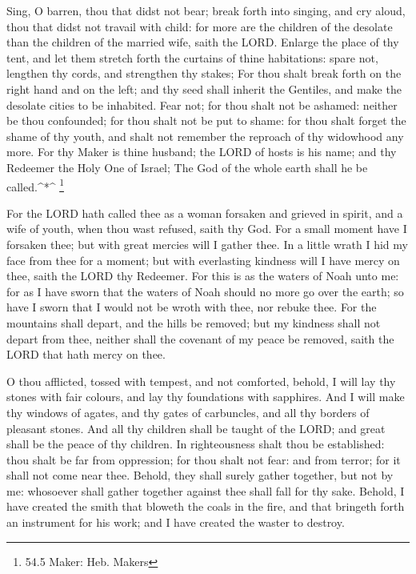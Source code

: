  Sing, O barren, thou that didst not bear; break forth into
singing, and cry aloud, thou that didst not travail with child: for more
are the children of the desolate than the children of the married wife,
saith the LORD.  Enlarge the place of thy tent, and let them
stretch forth the curtains of thine habitations: spare not, lengthen thy
cords, and strengthen thy stakes;  For thou shalt break
forth on the right hand and on the left; and thy seed shall inherit the
Gentiles, and make the desolate cities to be inhabited. 
Fear not; for thou shalt not be ashamed: neither be thou confounded; for
thou shalt not be put to shame: for thou shalt forget the shame of thy
youth, and shalt not remember the reproach of thy widowhood any more.
 For thy Maker is thine husband; the LORD of hosts is his
name; and thy Redeemer the Holy One of Israel; The God of the whole
earth shall he be called.\^{}*\^{} \footnote{54.5 Maker: Heb. Makers}

 For the LORD hath called thee as a woman forsaken and
grieved in spirit, and a wife of youth, when thou wast refused, saith
thy God.  For a small moment have I forsaken thee; but with
great mercies will I gather thee.  In a little wrath I hid
my face from thee for a moment; but with everlasting kindness will I
have mercy on thee, saith the LORD thy Redeemer.  For this
is as the waters of Noah unto me: for as I have sworn that the waters of
Noah should no more go over the earth; so have I sworn that I would not
be wroth with thee, nor rebuke thee.  For the mountains
shall depart, and the hills be removed; but my kindness shall not depart
from thee, neither shall the covenant of my peace be removed, saith the
LORD that hath mercy on thee.

 O thou afflicted, tossed with tempest, and not comforted,
behold, I will lay thy stones with fair colours, and lay thy foundations
with sapphires.  And I will make thy windows of agates, and
thy gates of carbuncles, and all thy borders of pleasant stones.
 And all thy children shall be taught of the LORD; and
great shall be the peace of thy children.  In righteousness
shalt thou be established: thou shalt be far from oppression; for thou
shalt not fear: and from terror; for it shall not come near thee.
 Behold, they shall surely gather together, but not by me:
whosoever shall gather together against thee shall fall for thy sake.
 Behold, I have created the smith that bloweth the coals in
the fire, and that bringeth forth an instrument for his work; and I have
created the waster to destroy.

